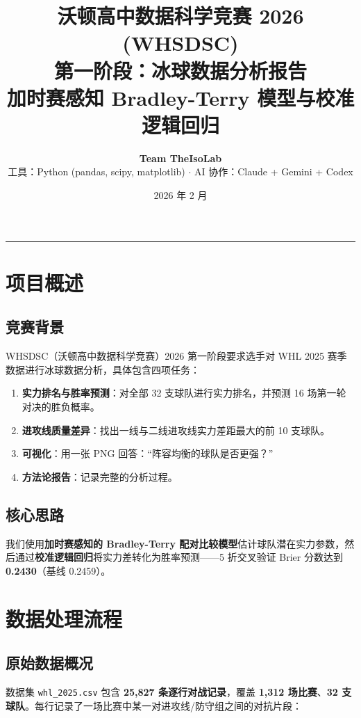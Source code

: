 \documentclass[11pt, a4paper]{article}
\title{%
    \vspace{-1cm}
    {\Large\textcolor{whartonblue}{沃顿高中数据科学竞赛 2026 (WHSDSC)}}\\[6pt]
    {\LARGE\textbf{第一阶段：冰球数据分析报告}}\\[4pt]
    {\large 加时赛感知 Bradley-Terry 模型与校准逻辑回归}
}
\author{%
    \textbf{Team TheIsoLab}\\[2pt]
    {\small 工具：Python (pandas, scipy, matplotlib) $\cdot$ AI 协作：Claude + Gemini + Codex}
}
\date{\small 2026 年 2 月}
\begin{document}
\maketitle
\thispagestyle{fancy}

\tableofcontents
\vspace{0.5cm}
\hrule
\vspace{0.5cm}

\section{项目概述}
\label{sec:overview}

\subsection{竞赛背景}
WHSDSC（沃顿高中数据科学竞赛）2026 第一阶段要求选手对 WHL 2025 赛季数据进行冰球数据分析，具体包含四项任务：

\begin{enumerate}[label=\textbf{(\alph*)}]
    \item \textbf{实力排名与胜率预测}：对全部 32 支球队进行实力排名，并预测 16 场第一轮对决的胜负概率。
    \item \textbf{进攻线质量差异}：找出一线与二线进攻线实力差距最大的前 10 支球队。
    \item \textbf{可视化}：用一张 PNG 回答：``阵容均衡的球队是否更强？''
    \item \textbf{方法论报告}：记录完整的分析过程。
\end{enumerate}

\subsection{核心思路}
我们使用\textbf{加时赛感知的 Bradley-Terry 配对比较模型}估计球队潜在实力参数，然后通过\textbf{校准逻辑回归}将实力差转化为胜率预测——5 折交叉验证 Brier 分数达到 \textbf{0.2430}（基线 0.2459）。

\section{数据处理流程}
\label{sec:data}

\subsection{原始数据概况}
数据集 \texttt{whl\_2025.csv} 包含 \textbf{25,827 条逐行对战记录}，覆盖 \textbf{1,312 场比赛}、\textbf{32 支球队}。每行记录了一场比赛中某一对进攻线/防守组之间的对抗片段：
\end{document}
